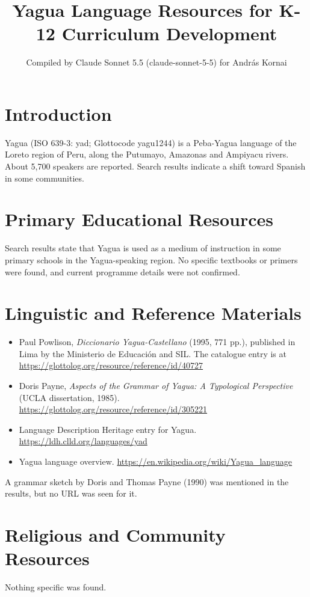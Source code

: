 \documentclass[12pt]{article}
\title{Yagua Language Resources for K-12 Curriculum Development}
\author{Compiled by Claude Sonnet 5.5 (claude-sonnet-5-5) for Andr\'as Kornai}
\date{}
\begin{document}
\maketitle

\section{Introduction}
Yagua (ISO 639-3: yad; Glottocode yagu1244) is a Peba-Yagua language of the Loreto region of Peru, along the Putumayo, Amazonas and Ampiyacu rivers. About 5,700 speakers are reported. Search results indicate a shift toward Spanish in some communities.

\section{Primary Educational Resources}
Search results state that Yagua is used as a medium of instruction in some primary schools in the Yagua-speaking region. No specific textbooks or primers were found, and current programme details were not confirmed.

\section{Linguistic and Reference Materials}
\begin{itemize}
\item Paul Powlison, \textit{Diccionario Yagua-Castellano} (1995, 771 pp.), published in Lima by the Ministerio de Educaci\'on and SIL. The catalogue entry is at \url{https://glottolog.org/resource/reference/id/40727}
\item Doris Payne, \textit{Aspects of the Grammar of Yagua: A Typological Perspective} (UCLA dissertation, 1985). \url{https://glottolog.org/resource/reference/id/305221}
\item Language Description Heritage entry for Yagua. \url{https://ldh.clld.org/languages/yad}
\item Yagua language overview. \url{https://en.wikipedia.org/wiki/Yagua_language}
\end{itemize}
A grammar sketch by Doris and Thomas Payne (1990) was mentioned in the results, but no URL was seen for it.

\section{Religious and Community Resources}
Nothing specific was found.
\end{document}
